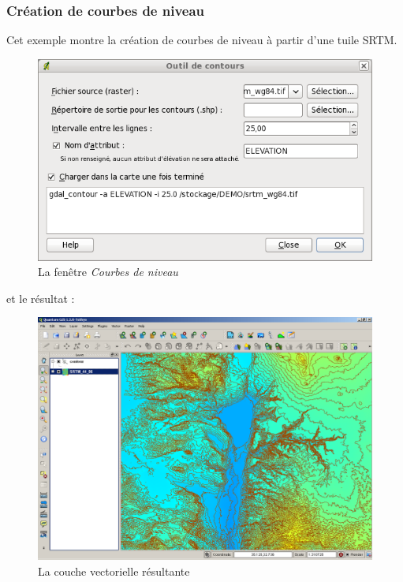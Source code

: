 {\subsubsection{Création de courbes de niveau}
Cet exemple montre la création de courbes de niveau à partir d'une tuile SRTM.
\begin{figure}[ht]
   \centering
   \caption{La fenêtre \emph{Courbes de niveau} \nixcaption}\label{gdal_contour}
   \includegraphics[clip=true, width=12cm]{plugins_gdaltools_images/gdal_contour}
\end{figure}
et le résultat :
\begin{figure}[ht]
   \centering
   \caption{La couche vectorielle résultante \nixcaption}\label{gdal_contour}
   \includegraphics[clip=true, width=12cm]{plugins_gdaltools_images/qgis_contours}
\end{figure}

}
